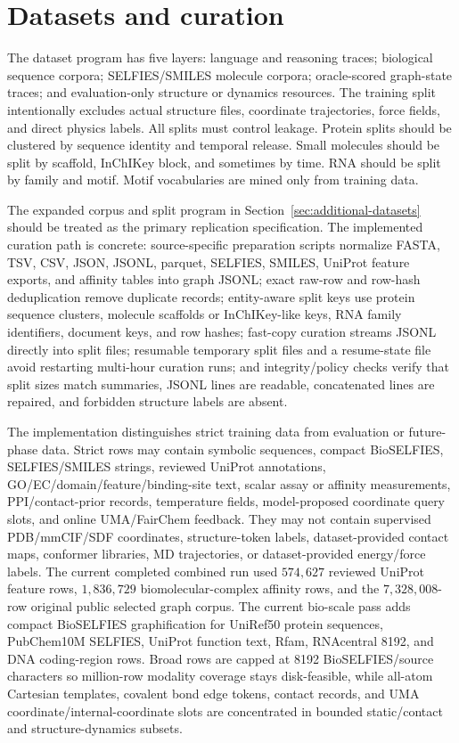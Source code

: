 \documentclass[11pt]{article}
\newcommand{\1}{\mathbf{1}}
\begin{document}
\section{Datasets and curation}

The dataset program has five layers: language and reasoning traces; biological sequence corpora; SELFIES/SMILES molecule corpora; oracle-scored graph-state traces; and evaluation-only structure or dynamics resources. The training split intentionally excludes actual structure files, coordinate trajectories, force fields, and direct physics labels. All splits must control leakage. Protein splits should be clustered by sequence identity and temporal release. Small molecules should be split by scaffold, InChIKey block, and sometimes by time. RNA should be split by family and motif. Motif vocabularies are mined only from training data.

The expanded corpus and split program in Section~\ref{sec:additional-datasets} should be treated as the primary replication specification. The implemented curation path is concrete: source-specific preparation scripts normalize FASTA, TSV, CSV, JSON, JSONL, parquet, SELFIES, SMILES, UniProt feature exports, and affinity tables into graph JSONL; exact raw-row and row-hash deduplication remove duplicate records; entity-aware split keys use protein sequence clusters, molecule scaffolds or InChIKey-like keys, RNA family identifiers, document keys, and row hashes; fast-copy curation streams JSONL directly into split files; resumable temporary split files and a resume-state file avoid restarting multi-hour curation runs; and integrity/policy checks verify that split sizes match summaries, JSONL lines are readable, concatenated lines are repaired, and forbidden structure labels are absent.

The implementation distinguishes strict training data from evaluation or future-phase data. Strict rows may contain symbolic sequences, compact BioSELFIES, SELFIES/SMILES strings, reviewed UniProt annotations, GO/EC/domain/feature/binding-site text, scalar assay or affinity measurements, PPI/contact-prior records, temperature fields, model-proposed coordinate query slots, and online UMA/FairChem feedback. They may not contain supervised PDB/mmCIF/SDF coordinates, structure-token labels, dataset-provided contact maps, conformer libraries, MD trajectories, or dataset-provided energy/force labels. The current completed combined run used $574{,}627$ reviewed UniProt feature rows, $1{,}836{,}729$ biomolecular-complex affinity rows, and the $7{,}328{,}008$-row original public selected graph corpus. The current bio-scale pass adds compact BioSELFIES graphification for UniRef50 protein sequences, PubChem10M SELFIES, UniProt function text, Rfam, RNAcentral 8192, and DNA coding-region rows. Broad rows are capped at 8192 BioSELFIES/source characters so million-row modality coverage stays disk-feasible, while all-atom Cartesian templates, covalent bond edge tokens, contact records, and UMA coordinate/internal-coordinate slots are concentrated in bounded static/contact and structure-dynamics subsets.
\end{document}
